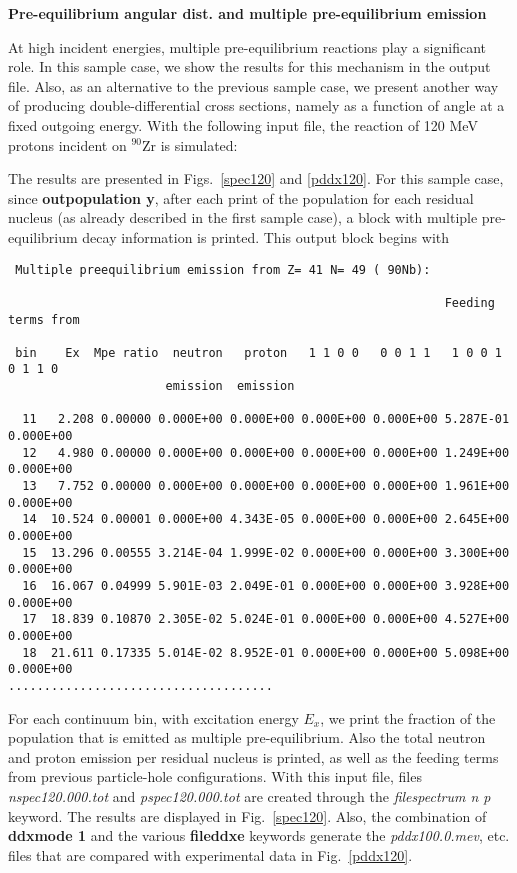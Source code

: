 \begin{samplecase}
{\bf Pre-equilibrium angular dist. and multiple pre-equilibrium emission}\newline

At high incident energies, multiple pre-equilibrium reactions play a
significant role. In this sample case, we show the results for this
mechanism in the output file. Also, as an alternative to the previous
sample case, we present another way of producing
double-differential cross sections, namely as a function of angle at a fixed
outgoing energy. With the following input file, the reaction of 120 MeV protons
incident on ${}^{90}$Zr is simulated:


The results are presented in Figs.~\ref{spec120} and \ref{pddx120}.
For this sample case, since {\bf outpopulation y},
after each print of the population for each residual nucleus (as already
described in the first sample case), a block with multiple pre-equilibrium
decay information is printed.
This output block begins with
{\small \begin{verbatim}
 Multiple preequilibrium emission from Z= 41 N= 49 ( 90Nb):

                                                             Feeding terms from

 bin    Ex  Mpe ratio  neutron   proton   1 1 0 0   0 0 1 1   1 0 0 1   0 1 1 0
                      emission  emission

  11   2.208 0.00000 0.000E+00 0.000E+00 0.000E+00 0.000E+00 5.287E-01 0.000E+00
  12   4.980 0.00000 0.000E+00 0.000E+00 0.000E+00 0.000E+00 1.249E+00 0.000E+00
  13   7.752 0.00000 0.000E+00 0.000E+00 0.000E+00 0.000E+00 1.961E+00 0.000E+00
  14  10.524 0.00001 0.000E+00 4.343E-05 0.000E+00 0.000E+00 2.645E+00 0.000E+00
  15  13.296 0.00555 3.214E-04 1.999E-02 0.000E+00 0.000E+00 3.300E+00 0.000E+00
  16  16.067 0.04999 5.901E-03 2.049E-01 0.000E+00 0.000E+00 3.928E+00 0.000E+00
  17  18.839 0.10870 2.305E-02 5.024E-01 0.000E+00 0.000E+00 4.527E+00 0.000E+00
  18  21.611 0.17335 5.014E-02 8.952E-01 0.000E+00 0.000E+00 5.098E+00 0.000E+00
.....................................
\end{verbatim} } \renewcommand{\baselinestretch}{1.07}\small\normalsize
\noindent
For each continuum bin, with excitation energy $E_{x}$, we print the fraction
of the population that is emitted as multiple pre-equilibrium. Also the total
neutron
and proton emission per residual nucleus is printed, as well as the feeding
terms from previous particle-hole configurations.
With this input file, files {\em nspec120.000.tot} and {\em pspec120.000.tot}
are created through the {\em filespectrum n p} keyword. The results are
displayed in Fig.~\ref{spec120}.
Also, the combination of {\bf ddxmode 1} and the various {\bf fileddxe} keywords
generate the {\em pddx100.0.mev}, etc. files that are compared with experimental
data in Fig.~\ref{pddx120}.

\end{samplecase}
